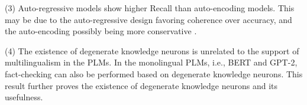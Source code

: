 \documentclass[]{article}
\begin{document}
(3) Auto-regressive models show higher Recall than auto-encoding models. This may be due to the auto-regressive design favoring coherence over accuracy, and the auto-encoding possibly being more conservative  \cite{zhou2023comprehensive}.

(4) The existence of degenerate knowledge neurons is unrelated to the support of multilingualism in the PLMs. In the monolingual PLMs, i.e., BERT and GPT-2, fact-checking can also be performed based on degenerate knowledge neurons. This result further proves the existence of degenerate knowledge neurons and its usefulness.
\begin{table}
\centering
{}
\end{table}
\end{document}
